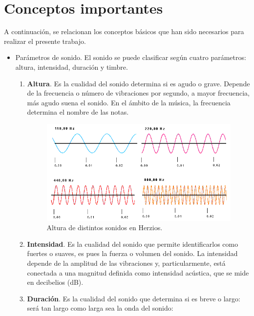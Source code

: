 \documentclass[a4paper, openright, 11pt, titlepage]{report}
\theoremstyle{definition}\newtheorem{defin}[propo]{Definition}
\theoremstyle{definition}\newtheorem{obser}[propo]{Remark}
\theoremstyle{definition}\newtheorem{ejem}[propo]{Ejemplo}
\theoremstyle{definition}\newtheorem{algoritmo}[propo]{Algoritmo}
\begin{document}
\chapter{Conceptos importantes}\label{aped.A}
A continuación, se relacionan los conceptos básicos que han sido necesarios para realizar el presente trabajo.
\begin{itemize}
    \item Parámetros de sonido. El sonido se puede clasificar según cuatro parámetros: altura, intensidad, duración y timbre.
    \begin{enumerate}
        \item \textbf{Altura}. Es la cualidad del sonido determina si es agudo o grave. Depende de la frecuencia o número de vibraciones por segundo, a mayor frecuencia, más agudo suena el sonido. En el ámbito de la música, la frecuencia determina el nombre de las notas.
        \begin{figure}[H]
            \centering
            \includegraphics[scale = 0.7]{alturaSonido.png}
            \caption{Altura de distintos sonidos en Herzios.}
        \end{figure}
        \item \textbf{Intensidad}. Es la cualidad del sonido que permite identificarlos como fuertes o suaves, es pues la fuerza o volumen del sonido. La intensidad depende de la amplitud de las vibraciones y, particularmente, está conectada a una magnitud definida como intensidad acústica, que se mide en decibelios (dB).
        \item \textbf{Duración}. Es la cualidad del sonido que determina si es breve o largo: será tan largo como larga sea la onda del sonido:
        \begin{figure}[H]
            \centering

\end{figure}
\end{enumerate}
\end{itemize}
\end{document}
